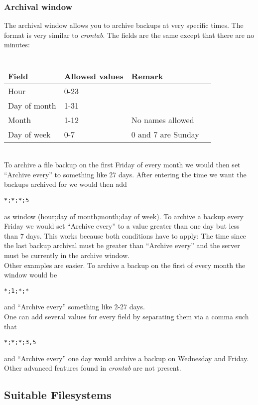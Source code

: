 \documentclass[a4paper,10pt]{article} \usepackage[breaklinks=true]{hyperref}
\begin{document}
\subsubsection{Archival window}
\label{subsub:archival_window}

The archival window allows you to archive backups at very specific times. The format is
very similar to \textsl{crontab}. The fields are the same except that there are no minutes:\\
\\
\begin{tabular}{|l|l|l|l|}
\hline
Field & Allowed values & Remark\\
\hline \hline
Hour & 0-23 &\\
\hline
Day of month & 1-31& \\
\hline
Month & 1-12 & No names allowed \\
\hline
Day of week & 0-7 & 0 and 7 are Sunday\\
\hline
\end{tabular}\\

\noindent To archive a file backup on the first Friday of every month we would
then set ``Archive every'' to something like 27 days. After entering the time we
want the backups archived for we would then add
\begin{verbatim}
*;*;*;5
\end{verbatim}
as window (hour;day of month;month;day of week).
To archive a backup every Friday we would set ``Archive every'' to a value
greater than one day but less than 7 days. This works because both conditions have to
apply: The time since the last backup archival must be greater than ``Archive every'' and
the server must be currently in the archive window.\\
Other examples are easier. To archive a backup on the first of every month the window
would be
\begin{verbatim}
*;1;*;*
\end{verbatim}
and ``Archive every'' something like 2-27 days.\\
One can add several values for every field by separating them via a comma such that
\begin{verbatim}
*;*;*;3,5
\end{verbatim}
and ``Archive every'' one day would archive a backup on Wednesday and Friday. Other
advanced features found in \textsl{crontab} are not present. 

\subsection{Suitable Filesystems}
\label{subsec_filesystems}
\end{document}
